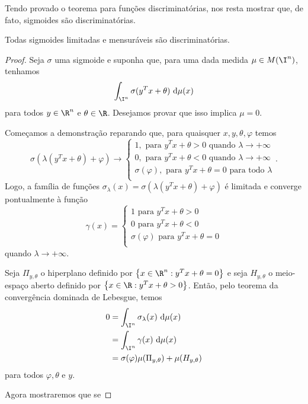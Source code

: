 Tendo provado o teorema para funções discriminatórias, nos resta mostrar que, de fato, sigmoides são discriminatórias.

\begin{lem}
    Todas sigmoides limitadas e mensuráveis são discriminatórias.
\end{lem}

\begin{proof}
    Seja \( \sigma \) uma sigmoide e suponha que, para uma dada medida \( \mu \in M(\I^{ n }) \), tenhamos \[
        \int_{ \I^{ n } } \sigma(y^{ T }x + \theta) \ \mathrm{d}\mu(x)
    \]
    para todos \( y \in \R^{ n } \) e \( \theta \in \R \).
    Desejamos provar que isso implica \( \mu = 0 \).

    Começamos a demonstração reparando que, para quaisquer \( x, y, \theta, \varphi \) temos \[
        \sigma(\lambda(y^{ T }x + \theta) + \varphi)
        \to
        \begin{cases}
            1, \text{ para } y^{ T }x + \theta > 0 \text{ quando } \lambda \to +\infty \\
            0, \text{ para } y^{ T }x + \theta < 0 \text{ quando } \lambda \to +\infty \\
            \sigma(\varphi), \text{ para } y^{ T }x + \theta = 0 \text{ para todo } \lambda \\
        \end{cases}
    .\]
    Logo, a família de funções \( \sigma_{ \lambda }(x) = \sigma(\lambda(y^{ T }x + \theta) + \varphi) \) é limitada e converge pontualmente à função \[
        \gamma(x) =
        \begin{cases}
            1 \text{ para } y^{ T }x + \theta > 0 \\
            0 \text{ para } y^{ T }x + \theta < 0 \\
            \sigma(\varphi) \text{ para } y^{ T }x + \theta = 0 \\
        \end{cases}
    \]
    quando \( \lambda \to +\infty \).

    Seja \( \Pi_{ y, \theta } \) o hiperplano definido por \( \left\{ x \in \R^{ n } : y^{ T }x + \theta = 0 \right\} \) e seja \( H_{ y, \theta } \) o meio-espaço aberto definido por \( \left\{ x \in \R : y^{ T }x + \theta > 0 \right\} \).
    Então, pelo teorema da convergência dominada de Lebesgue, temos %
    \begin{align*}
        0 &=
        \int_{ \I^{ n } } \sigma_{ \lambda }(x)  \ \mathrm{d}\mu(x) \\
        &= \int_{ \I^{ n } } \gamma(x) \ \mathrm{d}\mu(x) \\
        &= \sigma(\varphi)\mu(\Pi_{ y, \theta }) + \mu(H_{ y, \theta })
    \end{align*}
    para todos \( \varphi, \theta \) e \( y \).

    Agora mostraremos que se 
\end{proof}


